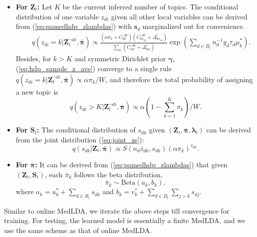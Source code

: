 \documentclass[twoside,11pt]{article}
\newcommand{\Zv}{\bm{Z}}
\newcommand{\sv}{\bm{s}}
\newcommand{\Sv}{\bm{S}}
\newcommand{\lambdav}{\bm \lambda}
\newcommand{\barpiv}{\bm{\bar{\pi}}}
\newcommand{\gammav}{\bm \gamma}
\newcommand{\B}{\mathrm{Beta}}
\begin{document}
\begin{enumerate}
%
\begin{itemize}
\item \textbf{For $\bm{Z}_t$: } Let $K$ be the current inferred number of topics. The conditional distribution of one variable $z_{di}$ given all other local variables can be derived from (\ref{eq:pamedhdp_zlambdas}) with $\sv_d$ marginalized out for convenience.
\setlength\arraycolsep{-3pt} \begin{eqnarray}\label{eq:hdp_sample_z_ave}
&&q(z_{di} =  k| \bm{Z}_{t}^{\neg di}, \barpiv)  \propto  \frac{(\alpha \pi_k+C_{dk}^{\neg di}) (C_{kx_{di}}^{\neg di}+\Delta_{kx_{di}}^t) }{\sum_{w}{(C_{kw}^{\neg di}+\Delta_{kw}^t)}} \exp\left( \sum\limits_{d \in B_t}{n_d^{-1} y_d \tau_d \mu^*_k}\right).
\end{eqnarray}
%
Besides, for $k > K$ and symmetric Dirichlet prior $\gammav$,  (\ref{eq:hdp_sample_z_ave}) converge to a single rule $q(z_{di} =  k| \bm{Z}_{t}^{\neg di}, \barpiv) \propto \alpha \pi_k / W$, and therefore the total probability of assigning a new topic is
\setlength\arraycolsep{1pt} \begin{equation*}\label{eq:hdp_sample_z2}
q(z_{di} > K | \Zv_{t}^{\neg di}, \barpiv) \propto \alpha \left( 1-\sum\limits_{k = 1}^{K}{\pi_k}\right)/W.
\end{equation*}


\item  \textbf{For $\bm{S}_t$: } The conditional distribution of $s_{dk}$ given $(\Zv_t, \barpiv, \lambdav_t)$ can be derived from the joint distribution (\ref{eq:joint_zs}):
\begin{equation}
\label{eq:hdp_sample_s}
q(s_{dk} | \Zv_{t}, \barpiv) \propto {S(n_d \bar{z}_{dk}, s_{dk}) (\alpha \pi_k)^{s_{dk}}}.
\end{equation}
\item  \textbf{For $\bm{\bar{\pi}}$:} It can be derived from (\ref{eq:pamedhdp_zlambdas}) that given $(\Zv_t, \Sv_t)$, each $\bar{\pi}_k$ follows the beta distribution, \begin{equation} \label{eq:hdp_sample_pi}
\bar{\pi}_k \sim \B(a_k, b_k),
\end{equation} where $a_k = u_k^* + \sum_{d \in B_t} s_{dk}$ and $b_k = v_k^* + \sum_{d \in B_t} \sum_{j > k} s_{dj}$.


\end{itemize}
\end{enumerate}
Similar to online MedLDA, we iterate the above steps till convergence for training. For testing, the learned model is essentially a finite MedLDA, and we use the same scheme as that of online MedLDA.
\end{document}
